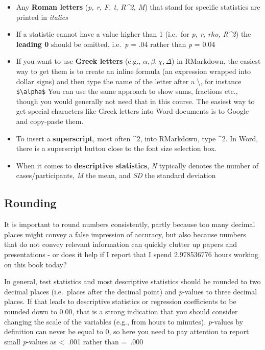 \documentclass[
]{book}
\providecommand{\tightlist}{%
  \setlength{\itemsep}{0pt}\setlength{\parskip}{0pt}}
\begin{document}
\begin{itemize}
\tightlist
\item
  Any \textbf{Roman letters} (\emph{p, r, F, t, R\^{}2, M}) that stand for specific statistics are printed in \emph{italics}
\item
  If a statistic cannot have a value higher than 1 (i.e.~for \emph{p, r, rho, R\^{}2}) the \textbf{leading 0} should be omitted, i.e.~\emph{p} = .04 rather than \emph{p} = 0.04
\item
  If you want to use \textbf{Greek letters} (e.g., \(\alpha, \beta, \chi, \Delta\)) in RMarkdown, the easiest way to get them is to create an inline formula (an expression wrapped into dollar signs) and then type the name of the letter after a \textbackslash, for instance \texttt{\$\textbackslash{}alpha\$} You can use the same approach to show sums, fractions etc., though you would generally not need that in this course. The easiest way to get special characters like Greek letters into Word documents is to Google and copy-paste them.
\item
  To insert a \textbf{superscript}, most often \^{}2, into RMarkdown, type \^{}2. In Word, there is a superscript button close to the font size selection box.
\item
  When it comes to \textbf{descriptive statistics}, \emph{N} typically denotes the number of cases/participants, \emph{M} the mean, and \emph{SD} the standard deviation
\end{itemize}

\hypertarget{rounding}{%
\subsection{Rounding}\label{rounding}}

It is important to round numbers consistently, partly because too many decimal places might convey a false impression of accuracy, but also because numbers that do not convey relevant information can quickly clutter up papers and presentations - or does it help if I report that I spend 2.978536776 hours working on this book today?

In general, test statistics and most descriptive statistics should be rounded to two decimal places (i.e.~places after the decimal point) and \emph{p}-values to three decimal places. If that leads to descriptive statistics or regression coefficients to be rounded down to 0.00, that is a strong indication that you should consider changing the scale of the variables (e.g., from hours to minutes). \emph{p}-values by definition can never be equal to 0, so here you need to pay attention to report small \emph{p}-values as \textless~.001 rather than =~.000
\end{document}

